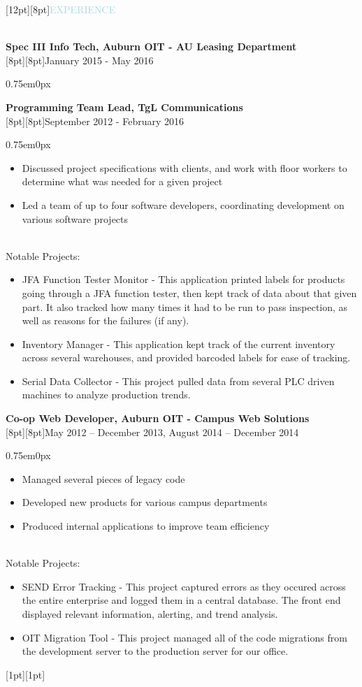 \documentclass[12pt]{res}
\newenvironment{ResumeBlock}[1]
{
	\begin{large}
		\raisebox{0pt}[12pt][8pt]{\textcolor{lightblue}{#1}}
	\end{large}
	\\
}
{	
}
\newenvironment{DetailsBlock}[2]
{
	\textbf{\color{darkfont}#1}
	\\
	\raisebox{0pt}[8pt][8pt]{#2}
	\begin{adjustwidth}{0.75em}{0px}
}
{	
	\end{adjustwidth}
}
\begin{document}
\begin{ResumeBlock}{EXPERIENCE}
\begin{DetailsBlock}{Spec III Info Tech, Auburn OIT - AU Leasing Department}{January 2015 - May 2016}
\begin{itemize}
			\end{itemize}
		\end{DetailsBlock}		
		\begin{DetailsBlock}{Programming Team Lead, TgL Communications}{September 2012 - February 2016}
			\begin{itemize}
				\item Discussed project specifications with clients, and work with floor workers to determine what was needed for a given project 
				\item Led a team of up to four software developers, coordinating development on various software projects
			\end{itemize}
			~\\
			Notable Projects:
			\begin{itemize}
				\item JFA Function Tester Monitor - This application printed labels for products going through a JFA function tester, then kept track of data about that given part.  It also tracked how many times it had to be run to pass inspection, as well as reasons for the failures (if any).
				\item Inventory Manager - This application kept track of the current inventory across several warehouses, and provided barcoded labels for ease of tracking. 
				\item Serial Data Collector - This project pulled data from several PLC driven machines to analyze production trends.   
			\end{itemize}
		\end{DetailsBlock}		
		\begin{DetailsBlock}{Co-op Web Developer, Auburn OIT - Campus Web Solutions}{May 2012 – December 2013, August 2014 – December 2014 }
			\begin{itemize}
				\item Managed several pieces of legacy code
				\item Developed new products for various campus departments 
				\item Produced internal applications to improve team efficiency 
			\end{itemize}
			~\\
			Notable Projects:
			\begin{itemize}
				\item SEND Error Tracking - This project captured errors as they occured across the entire enterprise and logged them in a central database.  The front end displayed relevant information, alerting, and trend analysis. 
				\item OIT Migration Tool - This project managed all of the code migrations from the development server to the production server for our office.
			\end{itemize}
			\raisebox{0pt}[1pt][1pt]{\space}
		\end{DetailsBlock}
	\end{ResumeBlock}	
\end{document}
